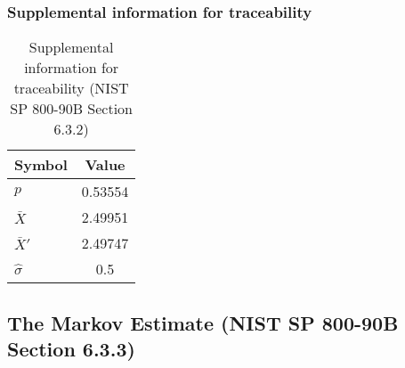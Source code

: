 \documentclass[a3paper,xelatex,english]{bxjsarticle}
\begin{document}
\subsubsection{Supplemental information for traceability}
\renewcommand{\arraystretch}{1.8}
\begin{table}[h]
\caption{Supplemental information for traceability (NIST SP 800-90B Section 6.3.2)}
\begin{center}
\begin{tabular}{|l|c|}
\hline 
\rowcolor{anotherlightblue} %
Symbol				& Value \\ \hline 
$p$				&  0.53554\\ \hline 
$\bar{X}$ 		&  2.49951\\ \hline
$\bar{X}'$		&  2.49747\\ \hline
$\hat{\sigma}$		&      0.5\\ \hline
\end{tabular}
\end{center}
\end{table}
\renewcommand{\arraystretch}{1.4}
\clearpage
\subsection{The Markov Estimate (NIST SP 800-90B Section 6.3.3)}\label{sec:Binary633}
\end{document}
